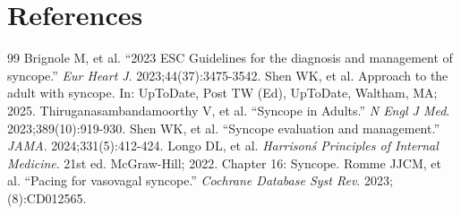 \section*{References}
\begin{thebibliography}{99}
 Brignole M, et al. ``2023 ESC Guidelines for the diagnosis and management of syncope.'' \emph{Eur Heart J}. 2023;44(37):3475-3542.
 Shen WK, et al. Approach to the adult with syncope. In: UpToDate, Post TW (Ed), UpToDate, Waltham, MA; 2025.
 Thiruganasambandamoorthy V, et al. ``Syncope in Adults.'' \emph{N Engl J Med}. 2023;389(10):919-930.
 Shen WK, et al. ``Syncope evaluation and management.'' \emph{JAMA}. 2024;331(5):412-424.
 Longo DL, et al. \emph{Harrison\'s Principles of Internal Medicine}. 21st ed. McGraw-Hill; 2022. Chapter 16: Syncope.
 Romme JJCM, et al. ``Pacing for vasovagal syncope.'' \emph{Cochrane Database Syst Rev}. 2023;(8):CD012565.
\end{thebibliography}
